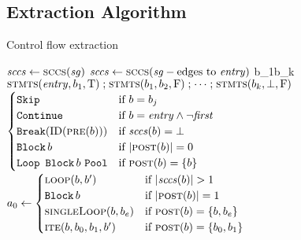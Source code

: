 \subsection{Extraction Algorithm}
\begin{algorithm}
  \caption{Control flow extraction}\label{algo:cf}
  \begin{algorithmic}
      \State $\var{sccs}\gets\Call{sccs}{\var{sg}}$
        \label{line:scc1}
        \State $\var{sccs}\gets\Call{sccs}{\var{sg}-\text{edges to }\var{entry}}$
        \label{line:scc2}
      \EndIf
      \State {}
      {\ll b_1\ll\dotsb\ll b_k\ll\bot}%
      \label{line:ipdoms}
      \State\Return $\Call{stmts}{\var{entry},b_1,\true}\ASeq
      \Call{stmts}{b_1,b_2,\false}\ASeq\dotsb\ASeq
      \Call{stmts}{b_k,\bot,\false}$
    \EndFunction
      \State\Return $\begin{cases}
        \ASkip & \text{if }b=b_j \\
        \AContinue & \text{if }b=\var{entry}\wedge\neg\var{first} \\
        \ABreak(\ID(\Call{pre}{b})) & \text{if }\var{sccs}(b)=\bot \\
        \ABB b & \text{if }\abs{\Call{post}{b}}=0 \\
        \AWhile~\ABB b~\AOd & \text{if }\Call{post}{b}=\{b\}
      \end{cases}$\label{line:prepost}
      \State {}
      \State $a_0\gets\begin{cases}
        \Call{loop}{b,b'} & \text{if }\abs{\var{sccs}(b)}>1 \\
        \ABB b & \text{if }\abs{\Call{post}{b}}=1 \\
        \Call{singleLoop}{b,b_e} & \text{if }\Call{post}{b}=\{b,b_e\} \\
        \Call{ite}{b,b_0,b_1,b'} & \text{if }\Call{post}{b}=\{b_0,b_1\}
      \end{cases}$\label{line:post}

\end{algorithmic}
\end{algorithm}

